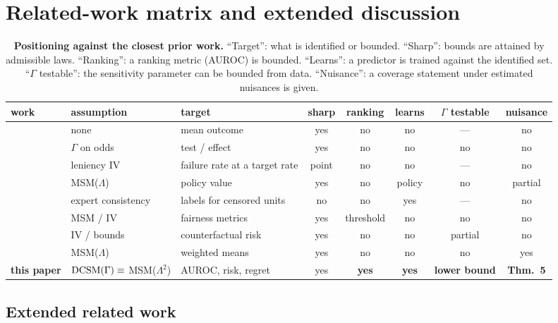 \section{Related-work matrix and extended discussion}
\label{app:related-matrix}

\begin{table}[h]
\centering\scriptsize
\caption{\textbf{Positioning against the closest prior work.} ``Target'':
what is identified or bounded. ``Sharp'': bounds are attained by admissible
laws. ``Ranking'': a ranking metric (AUROC) is bounded. ``Learns'': a
predictor is trained against the identified set. ``$\Gamma$ testable'': the
sensitivity parameter can be bounded from data. ``Nuisance'': a coverage
statement under estimated nuisances is given.}
\label{tab:related}
\begin{tabular}{lllccccc}
\toprule
work & assumption & target & sharp & ranking & learns & $\Gamma$ testable & nuisance\\
\midrule
\citet{manski1990nonparametric} & none & mean outcome & yes & no & no & --- & no\\
\citet{rosenbaum2002observational} & $\Gamma$ on odds & test / effect & yes & no & no & no & no\\
\citet{lakkaraju2017selective} & leniency IV & failure rate at a target rate & point & no & no & --- & no\\
\citet{kallus2018confounding} & MSM($\Lambda$) & policy value & yes & no & policy & no & partial\\
\citet{dearteaga2018learning} & expert consistency & labels for censored units & no & no & yes & --- & no\\
\citet{coston2021characterizing} & MSM / IV & fairness metrics & yes & threshold & no & no & no\\
\citet{rambachan2022counterfactual} & IV / bounds & counterfactual risk & yes & no & no & partial & no\\
\citet{dorn2023sharp} & MSM($\Lambda$) & weighted means & yes & no & no & no & yes\\
\textbf{this paper} & $\textup{DCSM}(\Gamma)\equiv$ MSM($\Lambda^2$) & AUROC, risk, regret & yes & \textbf{yes} & \textbf{yes} & \textbf{lower bound} & \textbf{Thm.~5}\\
\bottomrule
\end{tabular}
\end{table}

\subsection{Extended related work}
\label{app:related-full}

